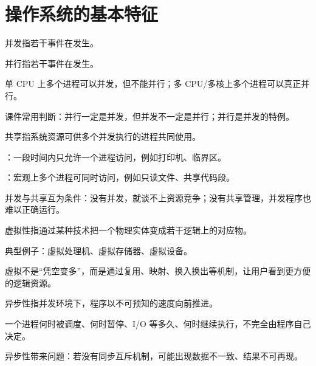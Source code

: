\section{操作系统的基本特征}
\begin{points}
  \item 并发指若干事件在发生。
  \item 并行指若干事件在发生。
  \item 单 CPU 上多个进程可以并发，但不能并行；多 CPU/多核上多个进程可以真正并行。
  \item 课件常用判断：并行一定是并发，但并发不一定是并行；并行是并发的特例。
\end{points}


\begin{points}
  \item 共享指系统资源可供多个并发执行的进程共同使用。
  \item {}：一段时间内只允许一个进程访问，例如打印机、临界区。
  \item {}：宏观上多个进程可同时访问，例如只读文件、共享代码段。
  \item 并发与共享互为条件：没有并发，就谈不上资源竞争；没有共享管理，并发程序也难以正确运行。
\end{points}


\begin{points}
  \item 虚拟性指通过某种技术把一个物理实体变成若干逻辑上的对应物。
  \item 典型例子：虚拟处理机、虚拟存储器、虚拟设备。
  \item 虚拟不是“凭空变多”，而是通过复用、映射、换入换出等机制，让用户看到更方便的逻辑资源。
\end{points}


\begin{points}
  \item 异步性指并发环境下，程序以不可预知的速度向前推进。
  \item 一个进程何时被调度、何时暂停、I/O 等多久、何时继续执行，不完全由程序自己决定。
  \item 异步性带来问题：若没有同步互斥机制，可能出现数据不一致、结果不可再现。
\end{points}


